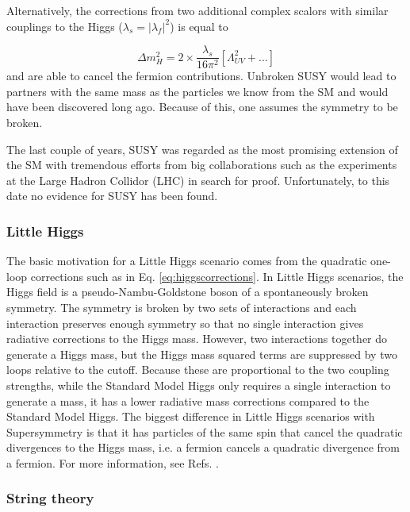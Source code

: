 Alternatively, the corrections from two additional complex scalors with similar couplings to the Higgs ($\lambda_s = \left|\lambda_f\right|^2$) is equal to

\begin{equation}
\Delta m^2_H = 2 \times \frac{\lambda_s}{16\pi^2}\left[ \Lambda^2_{UV}+... \right]
\end{equation}
and are able to cancel the fermion contributions. Unbroken SUSY would lead to partners with the same mass as the particles we know from the SM and would have been discovered long ago. Because of this, one assumes the symmetry to be broken.

The last couple of years, SUSY was regarded as the most promising extension of the SM with tremendous efforts from big collaborations such as the experiments at the Large Hadron Collidor (LHC) in search for proof. Unfortunately, to this date no evidence for SUSY has been found.

\subsubsection*{Little Higgs}
The basic motivation for a Little Higgs scenario comes from the quadratic one-loop corrections such as in Eq. \ref{eq:higgscorrections}. In Little Higgs scenarios, the Higgs field is a pseudo-Nambu-Goldstone boson of a spontaneously broken symmetry. The symmetry is broken by two sets of interactions and each interaction preserves enough symmetry so that no single interaction gives radiative corrections to the Higgs mass. However, two interactions together do generate a Higgs mass, but the Higgs mass squared terms are suppressed by two loops relative to the cutoff. Because these are proportional to the two coupling strengths, while the Standard Model Higgs only requires a single interaction to generate a mass, it has a lower radiative mass corrections compared to the Standard Model Higgs. The biggest difference in Little Higgs scenarios with Supersymmetry is that it has particles of the same spin that cancel the quadratic divergences to the Higgs mass, i.e. a fermion cancels a quadratic divergence from a fermion. For more information, see Refs. \cite{Cheng:2007bu,Reuter:2012sd}.	

\subsubsection*{String theory}

\fi




